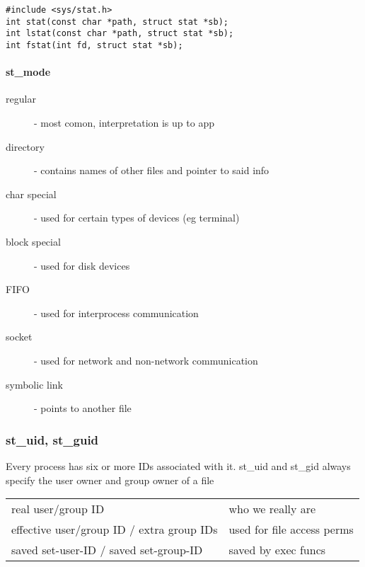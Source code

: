 \documentclass[10pt]{article}
\begin{document}
\begin{multicols}{2}
\begin{minipage}{0.8\columnwidth}
\begin{lstlisting}
#include <sys/stat.h>
int stat(const char *path, struct stat *sb);
int lstat(const char *path, struct stat *sb);
int fstat(int fd, struct stat *sb);
        \end{lstlisting}
        \paragraph*{st\_mode}
        \begin{description}
            \item[regular] - most comon, interpretation is up to app
            \item[directory] - contains names of other files and pointer to said info
            \item[char special] - used for certain types of devices (eg terminal)
            \item[block special] - used for disk devices
            \item[FIFO] - used for interprocess communication
            \item[socket] - used for network and non-network communication
            \item[symbolic link] - points to another file
        \end{description}
        \subsubsection*{st\_uid, st\_guid}
        Every process has six or more IDs associated with it.
        st\_uid and st\_gid always specify the user owner and group owner of a file
        \begin{tabular}{ll}
            \hline
            real user/group ID                        & who we really are          \\
            effective user/group ID / extra group IDs & used for file access perms \\
            saved set-user-ID / saved set-group-ID    & saved by exec funcs        \\
        \end{tabular}

\end{minipage}
\end{multicols}
\end{document}
